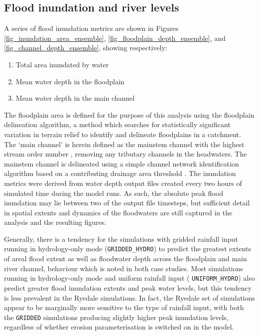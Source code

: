 \subsection{Flood inundation and river levels}
A series of flood inundation metrics are shown in Figures \ref{fig_inundation_area_ensemble}, \ref{fig_floodplain_depth_ensemble}, and \ref{fig_channel_depth_ensemble}, showing respectively:

\begin{enumerate}
\item Total area inundated by water
\item Mean water depth in the floodplain
\item Mean water depth in the main channel
\end{enumerate}

The floodplain area is defined for the purpose of this analysis using the \citet{clubbinpress} floodplain delineation algorithm, a method which searches for statistically significant variation in terrain relief to identify and delineate floodplains in a catchment. The `main channel' is herein defined as the mainstem channel with the highest stream order number \citep{strahler1957quantitative}, removing any tributary channels in the headwaters. The mainstem channel is delineated using a simple channel network identification algorithm based on a contributing drainage area threshold \citep{ocallaghan1984extraction,tarboton1991extraction}. The inundation metrics were derived from water depth output files created every two hours of simulated time during the model runs. As such, the absolute peak flood inundation may lie between two of the output file timesteps, but sufficient detail in spatial extents and dynamics of  the floodwaters are still captured in the analysis and the resulting figures. 

Generally, there is a tendency for the simulations with gridded rainfall input  running in hydrology-only mode (\texttt{GRIDDED\_HYDRO}) to predict the greatest extents of areal flood extent as well as floodwater depth across the floodplain and main river channel, behaviour which is noted in both case studies. Most simulations running in hydrology-only mode and uniform rainfall input ( \texttt{UNIFORM\_HYDRO}) also predict greater flood inundation extents and peak water levels, but this tendency is less prevalent in the Ryedale simulations. In fact, the Ryedale set of simulations appear to be marginally more sensitive to the type of rainfall input, with both the \texttt{GRIDDED} simulations producing slightly higher peak inundation levels, regardless of whether erosion parameterisation is switched on in the model.

